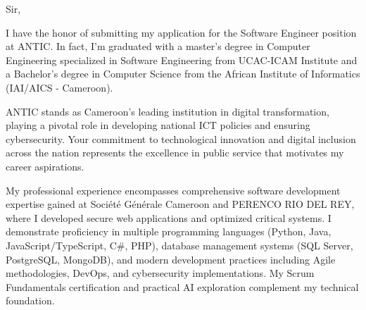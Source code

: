 \documentclass[11pt, a4paper]{../../../awesome-cv}
\begin{document}
\makecvheader[L]


\makelettertitle

\begin{cvletter}



Sir,

\setlength{\parindent}{2em}

\indent  I have the honor of submitting my application for the Software Engineer position at ANTIC. In fact, I'm graduated with a master's degree in Computer Engineering specialized in Software Engineering from UCAC-ICAM Institute and a Bachelor's degree in Computer Science from the African Institute of Informatics (IAI/AICS - Cameroon).

\indent ANTIC stands as Cameroon's leading institution in digital transformation, playing a pivotal role in developing national ICT policies and ensuring cybersecurity. Your commitment to technological innovation and digital inclusion across the nation represents the excellence in public service that motivates my career aspirations.

\indent My professional experience encompasses comprehensive software development expertise gained at Société Générale Cameroon and PERENCO RIO DEL REY, where I developed secure web applications and optimized critical systems. I demonstrate proficiency in multiple programming languages (Python, Java, JavaScript/TypeScript, C\#, PHP), database management systems (SQL Server, PostgreSQL, MongoDB), and modern development practices including Agile methodologies, DevOps, and cybersecurity implementations. My Scrum Fundamentals certification and practical AI exploration complement my technical foundation.


\end{cvletter}
\end{document}
